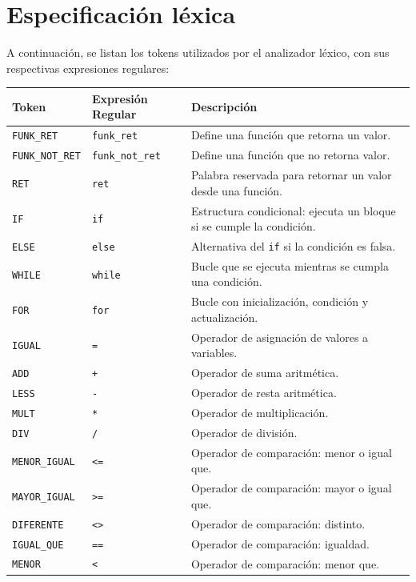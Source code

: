 \documentclass[12pt]{article}
\begin{document}
\section*{Especificación léxica}
A continuación, se listan los tokens utilizados por el analizador léxico, con sus respectivas expresiones regulares:

\begin{center}
\renewcommand{\arraystretch}{1.2}
\begin{tabular}{|l|l|p{7cm}|}
\hline
\textbf{Token} & \textbf{Expresión Regular} & \textbf{Descripción} \\
\hline
\texttt{FUNK\_RET} & \verb|funk_ret| & Define una función que retorna un valor. \\
\texttt{FUNK\_NOT\_RET} & \verb|funk_not_ret| & Define una función que no retorna valor. \\
\texttt{RET} & \verb|ret| & Palabra reservada para retornar un valor desde una función. \\
\texttt{IF} & \verb|if| & Estructura condicional: ejecuta un bloque si se cumple la condición. \\
\texttt{ELSE} & \verb|else| & Alternativa del \texttt{if} si la condición es falsa. \\
\texttt{WHILE} & \verb|while| & Bucle que se ejecuta mientras se cumpla una condición. \\
\texttt{FOR} & \verb|for| & Bucle con inicialización, condición y actualización. \\
\texttt{IGUAL} & \verb|=| & Operador de asignación de valores a variables. \\
\texttt{ADD} & \verb|+| & Operador de suma aritmética. \\
\texttt{LESS} & \verb|-| & Operador de resta aritmética. \\
\texttt{MULT} & \verb|*| & Operador de multiplicación. \\
\texttt{DIV} & \verb|/| & Operador de división. \\
\texttt{MENOR\_IGUAL} & \verb|<=| & Operador de comparación: menor o igual que. \\
\texttt{MAYOR\_IGUAL} & \verb|>=| & Operador de comparación: mayor o igual que. \\
\texttt{DIFERENTE} & \verb|<>| & Operador de comparación: distinto. \\
\texttt{IGUAL\_QUE} & \verb|==| & Operador de comparación: igualdad. \\
\texttt{MENOR} & \verb|<| & Operador de comparación: menor que. \\

\end{tabular}
\end{center}
\end{document}
